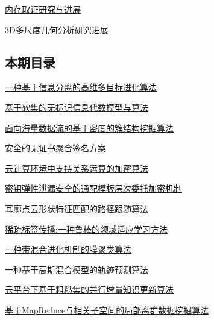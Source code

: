 \documentclass[a4paper]{article}
\begin{document}
\href{http://www.jos.org.cn/ch/reader/download_pdf.aspx?file_no=4821&year_id=2015&quarter_id=5&falg=1}{内存取证研究与进展}

\href{http://www.jos.org.cn/ch/reader/download_pdf.aspx?file_no=4822&year_id=2015&quarter_id=5&falg=1}{3D多尺度几何分析研究进展}

\subsection{本期目录}
\href{http://www.jos.org.cn/ch/reader/download_pdf.aspx?file_no=4676&year_id=2015&quarter_id=5&falg=1}{一种基于信息分离的高维多目标进化算法}

\href{http://www.jos.org.cn/ch/reader/download_pdf.aspx?file_no=4686&year_id=2015&quarter_id=5&falg=1}{基于软集的无标记信息代数模型与算法}

\href{http://www.jos.org.cn/ch/reader/download_pdf.aspx?file_no=4717&year_id=2015&quarter_id=5&falg=1}{面向海量数据流的基于密度的簇结构挖掘算法}

\href{http://www.jos.org.cn/ch/reader/download_pdf.aspx?file_no=4654&year_id=2015&quarter_id=5&falg=1}{安全的无证书聚合签名方案}

\href{http://www.jos.org.cn/ch/reader/download_pdf.aspx?file_no=4656&year_id=2015&quarter_id=5&falg=1}{云计算环境中支持关系运算的加密算法}

\href{http://www.jos.org.cn/ch/reader/download_pdf.aspx?file_no=4693&year_id=2015&quarter_id=5&falg=1}{密钥弹性泄漏安全的通配模板层次委托加密机制}

\href{http://www.jos.org.cn/ch/reader/download_pdf.aspx?file_no=4699&year_id=2015&quarter_id=5&falg=1}{耳廓点云形状特征匹配的路径跟随算法}

\href{http://www.jos.org.cn/ch/reader/download_pdf.aspx?file_no=4575&year_id=2015&quarter_id=5&falg=1}{稀疏标签传播:一种鲁棒的领域适应学习方法}

\href{http://www.jos.org.cn/ch/reader/download_pdf.aspx?file_no=4657&year_id=2015&quarter_id=5&falg=1}{一种带混合进化机制的膜聚类算法}

\href{http://www.jos.org.cn/ch/reader/download_pdf.aspx?file_no=4796&year_id=2015&quarter_id=5&falg=1}{一种基于高斯混合模型的轨迹预测算法}

\href{http://www.jos.org.cn/ch/reader/download_pdf.aspx?file_no=4590&year_id=2015&quarter_id=5&falg=1}{云平台下基于粗糙集的并行增量知识更新算法}

\href{http://www.jos.org.cn/ch/reader/download_pdf.aspx?file_no=4659&year_id=2015&quarter_id=5&falg=1}{基于MapReduce与相关子空间的局部离群数据挖掘算法}
\end{document}
